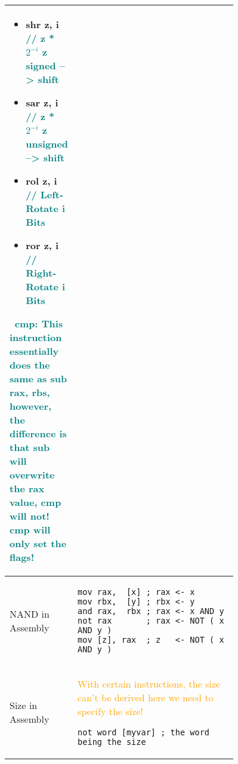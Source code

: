 \documentclass[main.tex,fontsize=8pt,paper=a4,paper=portrait,DIV=calc,]{scrartcl}
\begin{document}
\begin{table}[h!]
\begin{tabular}{|m{0,2\linewidth}|m{0.755\linewidth}|}
\begin{itemize}
\item shr z,   i  \textcolor{teal}{// z * \(2^{-i}\) z signed   --> shift}
\item sar z,   i  \textcolor{teal}{// z * \(2^{-i}\) z unsigned --> shift}
\item rol z,   i  \textcolor{teal}{// Left-Rotate i Bits }
\item ror z,   i  \textcolor{teal}{// Right-Rotate i Bits }
\end{itemize}
\, \newline
\textcolor{teal}{cmp: This instruction essentially does the same as sub rax, rbs, however,\newline
the difference is that sub will overwrite the rax value, cmp will not!\newline
\textbf{cmp will only set the flags!}}\newline
\\
\hline
NAND in Assembly & 
\begin{lstlisting}
mov rax,  [x] ; rax <- x
mov rbx,  [y] ; rbx <- y
and rax,  rbx ; rax <- x AND y
not rax       ; rax <- NOT ( x AND y )
mov [z], rax  ; z   <- NOT ( x AND y )
\end{lstlisting}\\
\hline
Size in Assembly & 
\textcolor{orange}{With certain instructions, the size can't be derived\newline
here we need to specify the size!}\newline
\begin{lstlisting}
not word [myvar] ; the word being the size
\end{lstlisting}\\
\hline
\end{tabular}
\end{table}
\pagebreak
\end{document}
